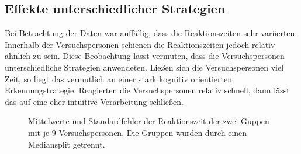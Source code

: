 \documentclass[doc,a4paper,12pt]{apa6}
\begin{document}

\subsection{Effekte unterschiedlicher Strategien}

Bei Betrachtung der Daten war auffällig, dass die Reaktionszeiten sehr variierten. Innerhalb der Versuchspersonen schienen die Reaktionszeiten jedoch relativ ähnlich zu sein. Diese Beobachtung lässt vermuten, dass die Versuchspersonen unterschiedliche Strategien anwendeten. Ließen sich die Versuchspersonen viel Zeit, so liegt das vermutlich an einer stark kognitiv orientierten Erkennungstrategie. Reagierten die Versuchspersonen relativ schnell, dann lässt das auf eine eher intuitive Verarbeitung schließen.

\begin{figure}[t]
  \centering
  \begin{minipage}{\textwidth}
    \vspace{10pt}
    \caption{Mittelwerte und Standardfehler der Reaktionszeit der zwei Guppen mit je 9 Versuchspersonen. Die Gruppen wurden durch einen Mediansplit getrennt.}
    \label{strat}
  \end{minipage}
\end{figure}
\end{document}
